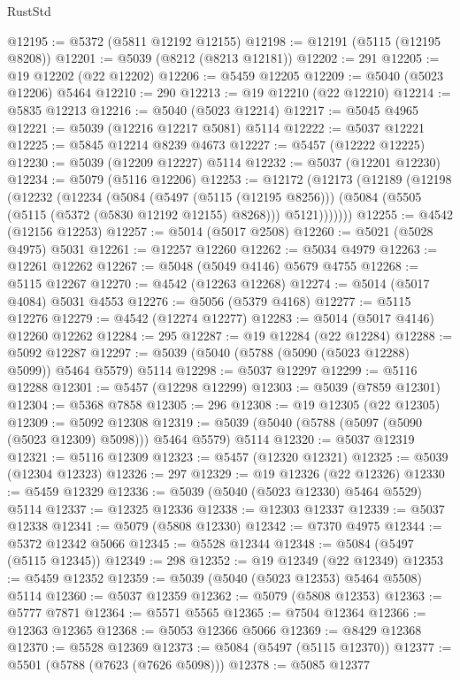 \begin{lexlean}{RustStd}
\begin{coremodule}
@12195 := @5372 (@5811 @12192 @12155)
@12198 := @12191 (@5115 (@12195 @8208))
@12201 := @5039 (@8212 (@8213 @12181))
@12202 := 291
@12205 := @19 @12202 (@22 @12202)
@12206 := @5459 @12205
@12209 := @5040 (@5023 @12206) @5464
@12210 := 290
@12213 := @19 @12210 (@22 @12210)
@12214 := @5835 @12213
@12216 := @5040 (@5023 @12214)
@12217 := @5045 @4965
@12221 := @5039 (@12216 @12217 @5081) @5114
@12222 := @5037 @12221
@12225 := @5845 @12214 @8239 @4673
@12227 := @5457 (@12222 @12225)
@12230 := @5039 (@12209 @12227) @5114
@12232 := @5037 (@12201 @12230)
@12234 := @5079 (@5116 @12206)
@12253 := @12172
    (@12173
      (@12189
        (@12198
          (@12232
            (@12234
              (@5084
                (@5497 (@5115 (@12195 @8256)))
                (@5084 (@5505 (@5115 (@5372 (@5830 @12192 @12155) @8268))) @5121)))))))
@12255 := @4542 (@12156 @12253)
@12257 := @5014 (@5017 @2508)
@12260 := @5021 (@5028 @4975) @5031
@12261 := @12257 @12260
@12262 := @5034 @4979
@12263 := @12261 @12262
@12267 := @5048 (@5049 @4146) @5679 @4755
@12268 := @5115 @12267
@12270 := @4542 (@12263 @12268)
@12274 := @5014 (@5017 @4084) @5031 @4553
@12276 := @5056 (@5379 @4168)
@12277 := @5115 @12276
@12279 := @4542 (@12274 @12277)
@12283 := @5014 (@5017 @4146) @12260 @12262
@12284 := 295
@12287 := @19 @12284 (@22 @12284)
@12288 := @5092 @12287
@12297 := @5039 (@5040 (@5788 (@5090 (@5023 @12288) @5099)) @5464 @5579) @5114
@12298 := @5037 @12297
@12299 := @5116 @12288
@12301 := @5457 (@12298 @12299)
@12303 := @5039 (@7859 @12301)
@12304 := @5368 @7858
@12305 := 296
@12308 := @19 @12305 (@22 @12305)
@12309 := @5092 @12308
@12319 := @5039 (@5040 (@5788 (@5097 (@5090 (@5023 @12309) @5098))) @5464 @5579) @5114
@12320 := @5037 @12319
@12321 := @5116 @12309
@12323 := @5457 (@12320 @12321)
@12325 := @5039 (@12304 @12323)
@12326 := 297
@12329 := @19 @12326 (@22 @12326)
@12330 := @5459 @12329
@12336 := @5039 (@5040 (@5023 @12330) @5464 @5529) @5114
@12337 := @12325 @12336
@12338 := @12303 @12337
@12339 := @5037 @12338
@12341 := @5079 (@5808 @12330)
@12342 := @7370 @4975
@12344 := @5372 @12342 @5066
@12345 := @5528 @12344
@12348 := @5084 (@5497 (@5115 @12345))
@12349 := 298
@12352 := @19 @12349 (@22 @12349)
@12353 := @5459 @12352
@12359 := @5039 (@5040 (@5023 @12353) @5464 @5508) @5114
@12360 := @5037 @12359
@12362 := @5079 (@5808 @12353)
@12363 := @5777 @7871
@12364 := @5571 @5565
@12365 := @7504 @12364
@12366 := @12363 @12365
@12368 := @5053 @12366 @5066
@12369 := @8429 @12368
@12370 := @5528 @12369
@12373 := @5084 (@5497 (@5115 @12370))
@12377 := @5501 (@5788 (@7623 (@7626 @5098)))
@12378 := @5085 @12377

\end{coremodule}
\end{lexlean}
